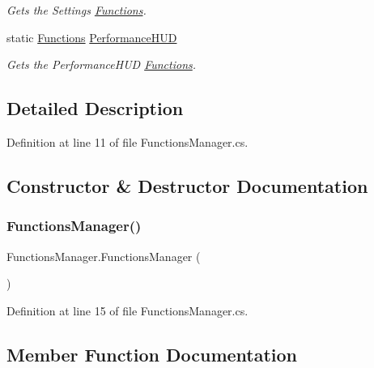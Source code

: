 \begin{DoxyCompactItemize}
\begin{DoxyCompactList}\small\item\em Gets the Settings \hyperlink{class_functions}{Functions}. \end{DoxyCompactList}\item 
static \hyperlink{class_functions}{Functions} \hyperlink{class_functions_manager_af5866c74169758f0dc46f2040acf15cd}{Performance\+H\+UD}
\begin{DoxyCompactList}\small\item\em Gets the Performance\+H\+UD \hyperlink{class_functions}{Functions}. \end{DoxyCompactList}\end{DoxyCompactItemize}


\subsection{Detailed Description}


Definition at line 11 of file Functions\+Manager.\+cs.



\subsection{Constructor \& Destructor Documentation}
\mbox{\label{class_functions_manager_ab3b4cff9b6a9c0acdc1b38faa2e6702c}} 
\subsubsection{\texorpdfstring{Functions\+Manager()}{FunctionsManager()}}
{\footnotesize\ttfamily Functions\+Manager.\+Functions\+Manager (\begin{DoxyParamCaption}{ }\end{DoxyParamCaption})}



Definition at line 15 of file Functions\+Manager.\+cs.



\subsection{Member Function Documentation}
\mbox{\label{class_functions_manager_a7922710417bbd3150afb6d3ee6783d70}} 
